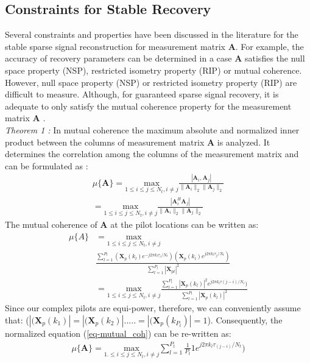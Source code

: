 \subsection{Constraints for Stable Recovery}
Several constraints and properties have been discussed in the literature for the stable sparse signal reconstruction for measurement matrix $\mathbf{A}$. For example, the accuracy of recovery parameters can be determined in a case $\mathbf{A}$ satisfies the null space property (NSP), restricted isometry property (RIP) or mutual coherence. However, null space property (NSP) or restricted isometry property (RIP) are difficult to measure.  Although,  for guaranteed sparse signal recovery,  it is adequate to only satisfy the mutual coherence property for the measurement matrix $\mathbf{A}$  \cite{RIP_Mutual}\cite{reviwsparse}. \\
\textit{Theorem 1 :} In mutual coherence the maximum absolute and normalized inner
product between the columns of measurement matrix $\mathbf{A}$ is analyzed.
It determines the correlation among the columns of the measurement matrix and can be formulated as \cite{reviwsparse}: 
\begin{align}
    \mu\{\mathbf{A}\}= \underset{1\le i \le j \le N_t, i\neq j}{\text{max} }\frac{|\mathbf{A}_i, \mathbf{A}_j|}{\| \mathbf{A}_i\|_2 \| \mathbf{A}_j\|_2} \nonumber \\
    =\underset{1\le i \le j \le N_t, i\neq j}{\text{max} }\frac{|\mathbf{A}_i^H \mathbf{A}_j|}{\| \mathbf{A}_i\|_2 \| \mathbf{A}_j\|_2}
\end{align}
The mutual coherence of $\mathbf{A}$ at the pilot locations can be written as:
\begin{align}
\mu\{A\}&=\underset{1\le i \le j \le N_t, i\neq j}{\text{max}}\\
& \frac{\sum^{P_t}_{l=1} (\mathbf{X}_p(k_l)  e^{-j2\pi k_l \tau_i/N_t}) (\mathbf{X}_p(k_l)  e^{j2\pi k_l \tau_j/N_t})}{\sum^{P_t}_{l=1}|\mathbf{X}_{pl} |^2} \nonumber \\
&=\underset{1\le i \le j \le N_t, i\neq j}{\text{max}} \frac{\sum^{P_t}_{l=1} |\mathbf{X}_p(k_l)|^2  e^{j2\pi k_l \tau (j-i)/N_t}) }{\sum^{P_t}_{l=1}|\mathbf{X}_p(k_l) |^2}       
\label{eq-mutual_coh}
\end{align}
Since our complex pilots are equi-power, therefore, we can conveniently assume that:
($|(\mathbf{X}_p(k_1) |= |(\mathbf{X}_p(k_2) | ..... =|(\mathbf{X}_p(k_{P_t})|=1$). 
Consequently, the normalized equation (\ref{eq-mutual_coh}) can be re-written as:
\begin{align}
\mu\{\mathbf{A}\}=\underset{1. \le i \le j \le N_t, i\neq j}{\text{max}} \sum^{P_t}_{l=1} \frac{1}{P_t} 1 e^{j2\pi k_l \tau_(j-i)/N_t}) \label{eq-mutual_coh_final}
\end{align}
